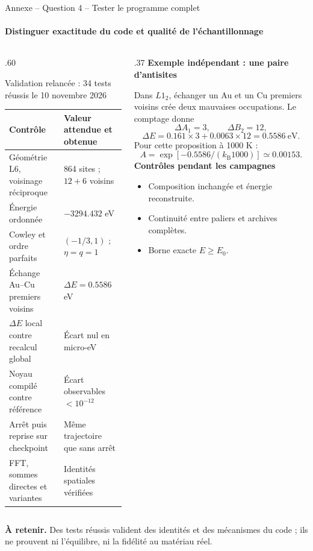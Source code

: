 \documentclass[aspectratio=169,10pt]{beamer}
\newcommand{\kb}{k_{\mathrm B}}
\newcommand{\takeaway}[1]{\par\smallskip\colorbox{pale}{\parbox{\dimexpr\linewidth-2\fboxsep\relax}{\strut\textbf{À retenir.} #1\strut}}}
\newcommand{\tightlist}{\setlength{\itemsep}{2pt}\setlength{\parskip}{0pt}}
\begin{document}
\begin{frame}[t]{Annexe -- Question 4 -- Tester le programme complet}
\framesubtitle{Distinguer exactitude du code et qualité de l'échantillonnage}
\begin{columns}[T,onlytextwidth]
\begin{column}{.60\textwidth}
\begin{block}{Validation relancée : 34 tests réussis le 10 novembre 2026}
\begin{tabular}{p{.47\linewidth}p{.43\linewidth}}\toprule
Contrôle & Valeur attendue et obtenue\\\midrule
Géométrie L6, voisinage réciproque & 864 sites ; $12+6$ voisins\\
Énergie ordonnée & $-3294.432$ eV\\
Cowley et ordre parfaits & $(-1/3,1)$ ; $\eta=q=1$\\
Échange Au--Cu premiers voisins & $\Delta E=0.5586$ eV\\
$\Delta E$ local contre recalcul global & Écart nul en micro-eV\\
Noyau compilé contre référence & Écart observables $<10^{-12}$\\
Arrêt puis reprise sur checkpoint & Même trajectoire que sans arrêt\\
FFT, sommes directes et variantes & Identités spatiales vérifiées\\\bottomrule
\end{tabular}
\end{block}
\end{column}
\begin{column}{.37\textwidth}
\textbf{Exemple indépendant : une paire d'antisites}

Dans $L1_2$, échanger un Au et un Cu premiers voisins crée deux mauvaises occupations.
Le comptage donne
\[
\Delta A_1=3,\qquad \Delta B_2=12,
\]
\[
\Delta E=0.161\times3+0.0063\times12
=0.5586\ \mathrm{eV}.
\]
Pour cette proposition à 1000 K :
\[
A=\exp[-0.5586/(\kb1000)]\simeq0.00153.
\]
\textbf{Contrôles pendant les campagnes}
\begin{itemize}\tightlist
\item Composition inchangée et énergie reconstruite.
\item Continuité entre paliers et archives complètes.
\item Borne exacte $E\geq E_0$.
\end{itemize}
\end{column}
\end{columns}
\takeaway{Des tests réussis valident des identités et des mécanismes du code ; ils ne prouvent ni l'équilibre, ni la fidélité au matériau réel.}
\end{frame}
\end{document}
